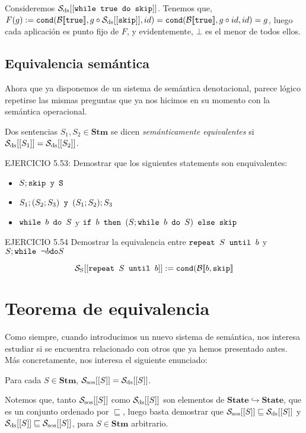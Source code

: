 \begin{example}
Consideremos $\mathcal{S}_{\mathrm{ds}}[[\texttt{while true do skip}]]$. Tenemos que, $F(g) := \texttt{cond}(\mathcal{B}[\![\texttt{true}]\!], g\circ\mathcal{S}_{\mathrm{ds}}[[\texttt{skip}]], id) =  \texttt{cond}(\mathcal{B}[\![\texttt{true}]\!], g\circ id, id) = g$, luego cada aplicación es punto fijo de $F$, y evidentemente, $\bot$ es el menor de todos ellos.

\end{example}
 
\subsection{Equivalencia semántica}

Ahora que ya disponemos de un sistema de semántica denotacional, parece lógico repetirse las mismas preguntas que ya nos hicimos en su momento con la semántica operacional.

\begin{definition}
Dos sentencias $S_1, S_2 \in \mathbf{Stm}$ se dicen \textit{semánticamente equivalentes} si $\mathcal{S}_{\mathrm{ds}}[[S_1]] = \mathcal{S}_{\mathrm{ds}}[[S_2]]$.
\end{definition}

\begin{example} 
EJERCICIO 5.53: Demostrar que los siguientes statements son enquivalentes:
\begin{itemize}
    \item $S; \texttt{skip  y S}$
    \item $S_1;(S_2;S_3) \texttt{ y } (S_1; S_2);S_3$ 
    \item $\texttt{while } b \texttt{ do } S $ y $\texttt{if } b \texttt{ then } (S; \texttt{while } b \texttt{ do } S ) \texttt{ else skip}  $
\end{itemize}
\end{example}

\begin{example}
EJERCICIO 5.54 Demostrar la equivalencia entre $\texttt{repeat } S \texttt{ until } b $ y $S; \texttt{while } \neg b \texttt{do} S $

$$ \mathcal{S}_{\mathrm{S}}[[ \texttt{repeat } S \texttt{ until } b ]] := \texttt{cond}(\mathcal{B}[\![b, \texttt{skip}]\!]$$

\end{example}


\section{Teorema de equivalencia}

Como siempre, cuando introducimos un nuevo sistema de semántica, nos interesa estudiar si se encuentra relacionado con otros que ya hemos presentado antes. Más concretamente, nos interesa el siguiente enunciado:

\begin{theorem}
Para cada $S \in \mathbf{Stm}$, $\mathcal{S}_{\mathrm{sos}}[[S]] = \mathcal{S}_{\mathrm{ds}}[[S]]$.
\end{theorem}

Notemos que, tanto $\mathcal{S}_{\mathrm{sos}}[[S]]$ como $\mathcal{S}_{\mathrm{ds}}[[S]]$ son elementos de $\mathbf{State}\hookrightarrow\mathbf{State}$, que es un conjunto ordenado por $\sqsubseteq$, luego basta demostrar que $\mathcal{S}_{\mathrm{sos}}[[S]] \sqsubseteq \mathcal{S}_{\mathrm{ds}}[[S]]$ y $\mathcal{S}_{\mathrm{ds}}[[S]] \sqsubseteq \mathcal{S}_{\mathrm{sos}}[[S]]$, para $S \in \mathbf{Stm}$ arbitrario.